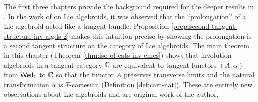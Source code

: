 The first three chapters provide the background required for the deeper results in . 
In the work of \cite{Weinstein1996,Martinez2001,Leon2005} on Lie algebroids, it was observed that the ``prolongation'' of a Lie algebroid acted like a tangent bundle. Proposition \ref{prop:second-tangent-structure-inv-algds-2} makes this intuition precise by showing the prolongation is a second tangent structure on the category of Lie algebroids. The main theorem in this chapter (Theorem \ref{thm:iso-of-cats-inv-emcs}) shows that involution algebroids in a tangent category $\mathbb{C}$ are equivalent to tangent functors $(A,\alpha)$ from $\mathsf{Weil}_1$ to $\mathbb{C}$ so that the functor $A$ preserves transverse limits and the natural transformation $\alpha$ is $T$-cartesian (Definition \ref{def:cart-nat}). These are entirely new observations about Lie algebroids and are original work of the author. 



